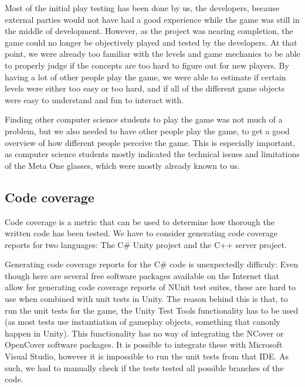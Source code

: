             Most of the initial play testing has been done by us, the developers,
            because external parties would not have had a good experience while 
            the game was still in the middle of development. However, as the 
            project was nearing completion, the game could no longer be objectively
            played and tested by the developers. At that point, we were already
            too familiar with the levels and game mechanics to be able to properly
            judge if the concepts are too hard to figure out for new players. By 
            having a lot of other people play the game, we were able to estimate if 
            certain levels were either too easy or too hard, and if all of the 
            different game objects were easy to understand and fun to interact with.

            Finding other computer science students to play the game was not much of 
            a problem, but we also needed to have other people play the game, to get 
            a good overview of how different people perceive the game. This is
            especially important, as computer science students mostly indicated the 
            technical issues and limitations of the Meta One glasses, which were mostly
            already known to us.
            
        
        \subsection{Code coverage} \label{ssec:codecoverage}
            Code coverage is a metric that can be used to determine how thorough
            the written code has been tested. We have to consider generating 
            code coverage reports for two languages: The C\# Unity project and 
            the C++ server project. 
            
            Generating code coverage reports for the C\# code is unexpectedly 
            difficuly: Even though here are several free software packages 
            available on the Internet that allow for generating code
            coverage reports of NUnit test suites, these are hard to use when 
            combined with unit tests in Unity. The reason behind this is that, 
            to run the unit tests for the game, the Unity Test Tools 
            functionality has to be used (as most tests use instantiation of 
            gameplay objects, something that canonly happen in Unity). This 
            functionality has no way of integrating the NCover or OpenCover 
            software packages. It is possible to integrate these with Microsoft 
            Visual Studio, however it is impossible to run the unit tests from 
            that IDE. As such, we had to manually check if the tests tested all 
            possible branches of the code.
            
